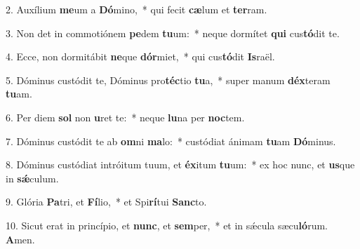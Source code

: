 2. Auxílium \textbf{me}um a \textbf{Dó}mino,~*  qui fecit \textbf{cæ}lum et \textbf{ter}ram.\

3. Non det in commotiónem \textbf{pe}dem \textbf{tu}um:~*  neque dormítet \textbf{qui} cus\textbf{tó}dit te.\

4. Ecce, non dormitábit \textbf{ne}que \textbf{dór}miet,~*  qui cus\textbf{tó}dit \textbf{Is}raël.\

5. Dóminus custódit te, Dóminus pro\textbf{téc}tio \textbf{tu}a,~*  super manum \textbf{déx}teram \textbf{tu}am.\

6. Per diem \textbf{sol} non \textbf{u}ret te:~*  neque \textbf{lu}na per \textbf{noc}tem.\

7. Dóminus custódit te ab \textbf{om}ni \textbf{ma}lo:~*  custódiat ánimam \textbf{tu}am \textbf{Dó}minus.\

8. Dóminus custódiat intróitum tuum, et \textbf{éx}itum \textbf{tu}um:~*  ex hoc nunc, et \textbf{us}que in \textbf{sǽ}culum.\

9. Glória \textbf{Pa}tri, et \textbf{Fí}lio,~*  et Spi\textbf{rí}tui \textbf{Sanc}to.\

10. Sicut erat in princípio, et \textbf{nunc}, et \textbf{sem}per,~*  et in sǽcula sæcu\textbf{ló}rum. \textbf{A}men.\

